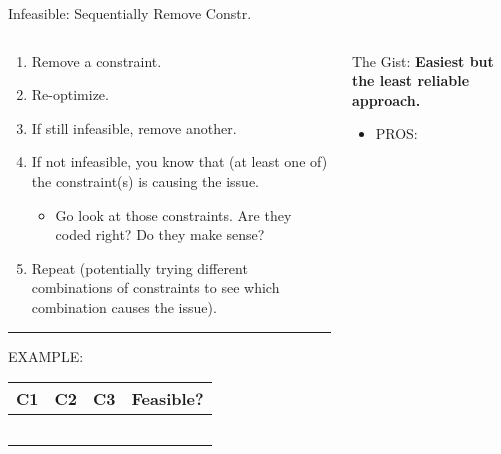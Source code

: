 \documentclass[10pt, aspectratio=169]{beamer}
\newcommand{\cmark}{\ding{51}}%
\newcommand{\xmark}{\ding{55}}%
\begin{document}
\begin{frame}{Infeasible: Sequentially Remove Constr.}
    \vspace{-0.4cm}
    \begin{columns}
        \begin{column}{0.5\textwidth}
            \begin{enumerate}
                \item Remove a constraint.
                \item Re-optimize.
                \item If still infeasible, remove another.
                \item If not infeasible, you know that (at least one of) the constraint(s) is causing the issue.
                \begin{itemize}
                    \item Go look at those constraints. Are they coded right? Do they make sense?
                \end{itemize}
                \item Repeat (potentially trying different combinations of constraints to see which combination causes the issue).
            \end{enumerate}
            \hrule
            \vspace{0.1cm}
            EXAMPLE:
            \begin{tabular}{|c|c|c||c|}
                \hline
                C1 & C2 & C3 & Feasible? \\
                \hline \hline
                \cmark & \cmark & \cmark & \xmark \\
                \xmark & \cmark & \cmark & \xmark \\
                \xmark & \xmark & \cmark & \cmark \\
                \cmark & \xmark & \cmark & \cmark \\
                \cmark & \cmark & \xmark & \cmark \\
                \hline
            \end{tabular}
        \end{column}
        \begin{column}{0.5\textwidth}
            The Gist: \textbf{Easiest but the least reliable approach.}
            \vspace{0.3cm}
            \begin{itemize}
                \item PROS:
                \begin{itemize}

\end{itemize}
\end{itemize}
\end{column}
\end{columns}
\end{frame}
\end{document}

